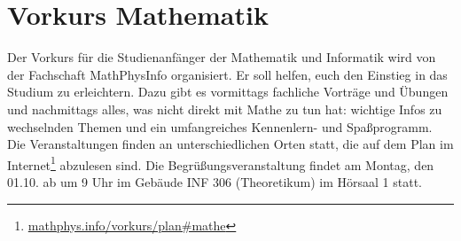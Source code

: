 \section{Vorkurs Mathematik}
Der Vorkurs für die Studienanfänger der Mathematik und Informatik wird von der Fachschaft MathPhysInfo organisiert. Er soll helfen, euch den Einstieg in das Studium zu erleichtern. Dazu gibt es vormittags fachliche Vorträge und Übungen und nachmittags alles, was nicht direkt mit Mathe zu tun hat: wichtige Infos zu wechselnden Themen und ein umfangreiches Kennenlern- und Spaßprogramm.
Die Veranstaltungen finden an unterschiedlichen Orten statt, die auf dem Plan im Internet\footnote{\url{mathphys.info/vorkurs/plan\#mathe}} abzulesen sind. Die Begrüßungsveranstaltung findet am Montag, den 01.10. ab um 9 Uhr im Gebäude \gls{INF} 306 (Theoretikum) im Hörsaal 1 statt.
